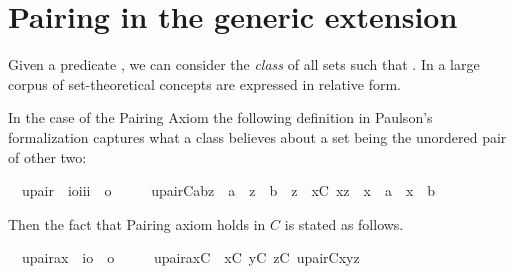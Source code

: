 \section{Pairing in the generic extension}
\label{sec:pairing-generic-extension}
Given a predicate
,
we can consider the \emph{class} of all sets  such that
. In \cite{MR2507047} a large corpus of set-theoretical
concepts are expressed in relative form.

In the case of the Pairing Axiom the following definition in 
Paulson's formalization captures
what a class  believes about a set being the unordered pair of
other two:
\begin{isabelle}
\isamarkupfalse%
\isanewline
\ \ upair\ {\isacharcolon}{\isacharcolon}\ {\isachardoublequoteopen}{\isacharbrackleft}i{\isasymRightarrow}o{\isacharcomma}i{\isacharcomma}i{\isacharcomma}i{\isacharbrackright}\ {\isasymRightarrow}\ o{\isachardoublequoteclose}\ \isanewline
\ \ \ \ {\isachardoublequoteopen}upair{\isacharparenleft}C{\isacharcomma}a{\isacharcomma}b{\isacharcomma}z{\isacharparenright}\ {\isacharequal}{\isacharequal}\ a\ {\isasymin}\ z\ {\isasymand}\ b\ {\isasymin}\ z\ {\isasymand}\ {\isacharparenleft}{\isasymforall}x{\isacharbrackleft}C{\isacharbrackright}{\isachardot}\ x{\isasymin}z\ {\isasymlongrightarrow}\ x\ {\isacharequal}\ a\ {\isasymor}\ x\ {\isacharequal}\ b{\isacharparenright}{\isachardoublequoteclose}
\end{isabelle}
%
Then the fact that Pairing axiom holds in $C$ is stated as follows.
%
\begin{isabelle}
\isamarkupfalse%
\isanewline
\ \ upair{\isacharunderscore}ax\ {\isacharcolon}{\isacharcolon}\ {\isachardoublequoteopen}{\isacharparenleft}i{\isasymRightarrow}o{\isacharparenright}\ {\isasymRightarrow}\ o{\isachardoublequoteclose}\ \isanewline
\ \ \ \ {\isachardoublequoteopen}upair{\isacharunderscore}ax{\isacharparenleft}C{\isacharparenright}\ {\isacharequal}{\isacharequal}\ {\isasymforall}x{\isacharbrackleft}C{\isacharbrackright}{\isachardot}\ {\isasymforall}y{\isacharbrackleft}C{\isacharbrackright}{\isachardot}\ {\isasymexists}z{\isacharbrackleft}C{\isacharbrackright}{\isachardot}\ upair{\isacharparenleft}C{\isacharcomma}x{\isacharcomma}y{\isacharcomma}z{\isacharparenright}{\isachardoublequoteclose}
\end{isabelle}

